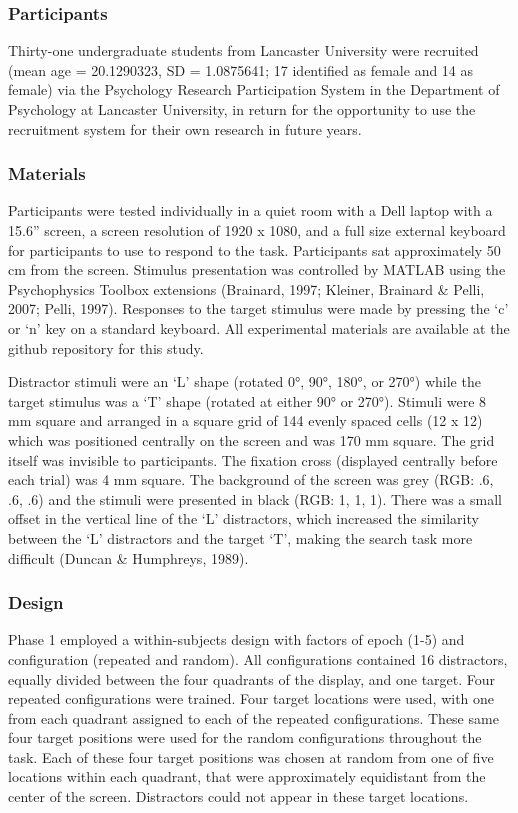 \documentclass[
  man,
  floatsintext,
  longtable,
  nolmodern,
  notxfonts,
  notimes,
  colorlinks=true,linkcolor=blue,citecolor=blue,urlcolor=blue]{apa7}
\begin{document}
\subsubsection{Participants}\label{participants}

Thirty-one undergraduate students from Lancaster University were
recruited (mean age = 20.1290323, SD = 1.0875641; 17 identified as
female and 14 as female) via the Psychology Research Participation
System in the Department of Psychology at Lancaster University, in
return for the opportunity to use the recruitment system for their own
research in future years.

\subsubsection{Materials}\label{materials}

Participants were tested individually in a quiet room with a Dell laptop
with a 15.6'' screen, a screen resolution of 1920 x 1080, and a full
size external keyboard for participants to use to respond to the task.
Participants sat approximately 50 cm from the screen. Stimulus
presentation was controlled by MATLAB using the Psychophysics Toolbox
extensions (Brainard, 1997; Kleiner, Brainard \& Pelli, 2007; Pelli,
1997). Responses to the target stimulus were made by pressing the `c' or
`n' key on a standard keyboard. All experimental materials are available
at the github repository for this study.

Distractor stimuli were an `L' shape (rotated 0°, 90°, 180°, or 270°)
while the target stimulus was a `T' shape (rotated at either 90° or
270°). Stimuli were 8 mm square and arranged in a square grid of 144
evenly spaced cells (12 x 12) which was positioned centrally on the
screen and was 170 mm square. The grid itself was invisible to
participants. The fixation cross (displayed centrally before each trial)
was 4 mm square. The background of the screen was grey (RGB: .6, .6, .6)
and the stimuli were presented in black (RGB: 1, 1, 1). There was a
small offset in the vertical line of the `L' distractors, which
increased the similarity between the `L' distractors and the target `T',
making the search task more difficult (Duncan \& Humphreys, 1989).

\subsubsection{Design}\label{design}

Phase 1 employed a within-subjects design with factors of epoch (1-5)
and configuration (repeated and random). All configurations contained 16
distractors, equally divided between the four quadrants of the display,
and one target. Four repeated configurations were trained. Four target
locations were used, with one from each quadrant assigned to each of the
repeated configurations. These same four target positions were used for
the random configurations throughout the task. Each of these four target
positions was chosen at random from one of five locations within each
quadrant, that were approximately equidistant from the center of the
screen. Distractors could not appear in these target locations.
\end{document}

